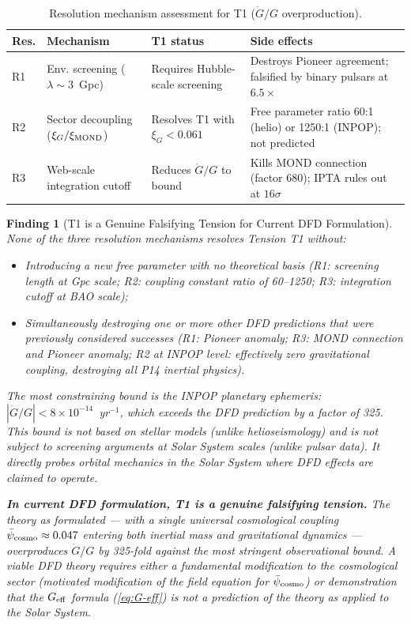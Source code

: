 \documentclass[aps,prd,twocolumn,superscriptaddress,nofootinbib,longbibliography]{revtex4-2}
\newcommand{\psibar}{\bar{\psi}}
\newcommand{\ee}[1]{\times 10^{#1}}
\newtheorem{finding}{Finding}
\begin{document}
\begin{table}[h]
\caption{Resolution mechanism assessment for T1 ($\dot{G}/G$ overproduction).}
\label{tab:resolution-summary}
\begin{ruledtabular}
\begin{tabular}{p{0.8cm}p{2cm}p{2cm}p{2.5cm}}
\textbf{Res.} & \textbf{Mechanism} & \textbf{T1 status} & \textbf{Side effects}\\
\hline
R1 & Env. screening ($\lambda\sim 3$~Gpc) & Requires Hubble-scale screening & Destroys Pioneer agreement; falsified by binary pulsars at $6.5\times$\\
R2 & Sector decoupling ($\xi_G/\xi_{\rm MOND}$) & Resolves T1 with $\xi_G < 0.061$ & Free parameter ratio 60:1 (helio) or 1250:1 (INPOP); not predicted\\
R3 & Web-scale integration cutoff & Reduces $\dot{G}/G$ to bound & Kills MOND connection (factor 680); IPTA rules out at $16\sigma$\\
\end{tabular}
\end{ruledtabular}
\end{table}

\begin{finding}[T1 is a Genuine Falsifying Tension for Current DFD Formulation]
\label{find:verdict}
None of the three resolution mechanisms resolves Tension T1 without:
\begin{itemize}
\item Introducing a new free parameter with no theoretical basis (R1: screening
  length at Gpc scale; R2: coupling constant ratio of 60--1250; R3: integration
  cutoff at BAO scale);
\item Simultaneously destroying one or more other DFD predictions that were
  previously considered successes (R1: Pioneer anomaly; R3: MOND connection
  and Pioneer anomaly; R2 at INPOP level: effectively zero gravitational
  coupling, destroying all P14 inertial physics).
\end{itemize}

The most constraining bound is the INPOP planetary ephemeris:
$|\dot{G}/G| < 8\ee{-14}$~yr$^{-1}$, which exceeds the DFD prediction by a
factor of 325.  This bound is not based on stellar models (unlike helioseismology)
and is not subject to screening arguments at Solar System scales (unlike
pulsar data).  It directly probes orbital mechanics in the Solar System where
DFD effects are claimed to operate.

\textbf{In current DFD formulation, T1 is a genuine falsifying tension.}
The theory as formulated --- with a single universal cosmological coupling
$\psibar_{\rm cosmo} \approx 0.047$ entering both inertial mass and
gravitational dynamics --- overproduces $\dot{G}/G$ by 325-fold against
the most stringent observational bound.  A viable DFD theory requires
either a fundamental modification to the cosmological sector (motivated
modification of the field equation for $\psibar_{\rm cosmo}$) or demonstration
that the $G_{\rm eff}$ formula (\ref{eq:G-eff}) is not a prediction of the
theory as applied to the Solar System.
\end{finding}
\end{document}
